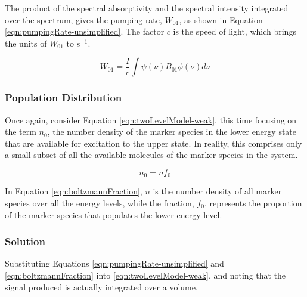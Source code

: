 
The product of the spectral absorptivity and the spectral intensity integrated over the spectrum, gives the pumping rate, \(W_{01}\), as shown in Equation \ref{eqn:pumpingRate-unsimplified}.
The factor \(c\) is the speed of light, which brings the units of \(W_{01}\) to s\(^{-1}\).

\begin{equation}
  W_{01} = \frac{I}{c} \int \psi(\nu) B_{01}\phi(\nu) d\nu
  \label{eqn:pumpingRate-unsimplified}
\end{equation}


\subsubsection{Population Distribution}
\label{subsubsec:basic-model-population-distribution}

Once again, consider Equation \ref{eqn:twoLevelModel-weak}, this time focusing on the term \(n_0\), the number density of the marker species in the lower energy state that are available for excitation to the upper state.
In reality, this comprises only a small subset of all the available molecules of the marker species in the system.

\begin{equation}
  n_0 = nf_0
  \label{eqn:boltzmannFraction}
\end{equation}


In Equation \ref{eqn:boltzmannFraction}, \(n\) is the number density of all marker species over all the energy levels, while the fraction, \(f_0\), represents the proportion of the marker species that populates the lower energy level.

\subsubsection{Solution}
\label{subsubsec:basic-model-solution}

Substituting Equations \ref{eqn:pumpingRate-unsimplified} and \ref{eqn:boltzmannFraction} into \ref{eqn:twoLevelModel-weak}, and noting that the signal produced is actually integrated over a volume,

